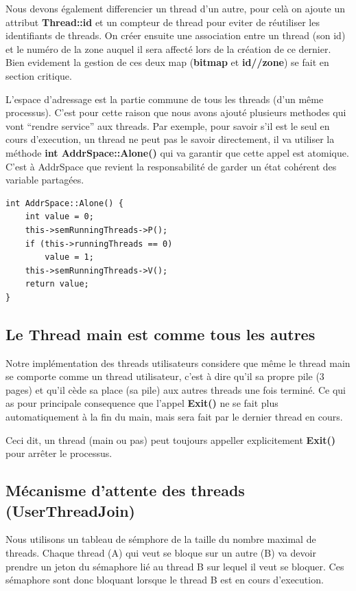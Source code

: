 \documentclass[a4paper,10pt]{article}
\begin{document}
Nous devons également differencier un thread d'un autre, pour celà on ajoute un
attribut \textbf{Thread::id} et un compteur de thread pour eviter de réutiliser
les identifiants de threads. On créer ensuite une association entre un thread
(son id) et le numéro de la zone auquel il sera affecté lors de la création de
ce dernier. Bien evidement la gestion de ces deux map (\textbf{bitmap} et
\textbf{id//zone}) se fait en section critique.

L'espace d'adressage est la partie commune de tous les threads (d'un même
processus). C'est pour cette raison que nous avons ajouté plusieurs methodes
qui vont ``rendre service'' aux threads. Par exemple, pour savoir s'il est le
seul en cours d'execution, un thread ne peut pas le savoir directement, il va
utiliser la méthode \textbf{int AddrSpace::Alone()} qui va garantir que cette
appel est atomique. C'est à AddrSpace que revient la responsabilité de garder
un état cohérent des variable partagées.

\begin{lstlisting}
int AddrSpace::Alone() {
    int value = 0;
    this->semRunningThreads->P();
    if (this->runningThreads == 0)
        value = 1;
    this->semRunningThreads->V();
    return value;
}
\end{lstlisting}

\subsection{Le Thread main est comme tous les autres}

Notre implémentation des threads utilisateurs considere que même le thread main
se comporte comme un thread utilisateur, c'est à dire qu'il sa propre pile (3
pages) et qu'il cède sa place (sa pile) aux autres threads une fois terminé. Ce
qui as pour principale consequence que l'appel \textbf{Exit()} ne se fait plus
automatiquement à la fin du main, mais sera fait par le dernier thread en cours.

Ceci dit, un thread (main ou pas) peut toujours appeller explicitement
\textbf{Exit()} pour arrêter le processus.


\subsection{Mécanisme d'attente des threads (UserThreadJoin)}

Nous utilisons un tableau de sémphore de la taille du nombre maximal de threads.
Chaque thread (A) qui veut se bloque sur un autre (B) va devoir prendre un jeton
du sémaphore lié au thread B sur lequel il veut se bloquer. Ces sémaphore sont
donc bloquant lorsque le thread B est en cours d'execution.
\end{document}
